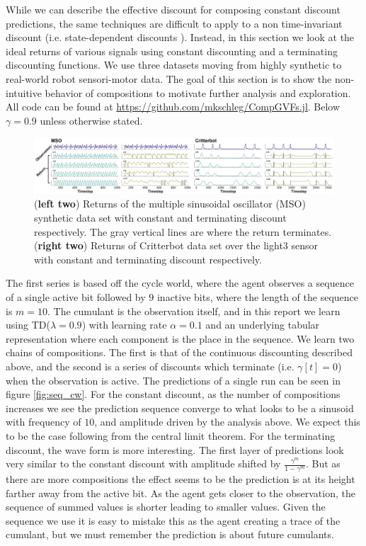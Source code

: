 \documentclass[11pt]{article} %
\begin{document}
While we can describe the effective discount for composing constant
discount predictions, the same techniques are difficult to apply to a
non time-invariant discount (i.e. state-dependent discounts
\parencite{white2015, sutton2011}).
Instead, in this section we look at the
ideal returns of various signals using constant discounting and a
terminating discounting functions. We use three
datasets moving from highly synthetic to real-world robot
sensori-motor data. The goal of this section is to show the
non-intuitive behavior of compositions to motivate further
analysis and exploration. All code can be found at \url{https://github.com/mkschleg/CompGVFs.jl}. Below $\gamma = 0.9$ unless otherwise stated.
%
%
\begin{figure}
  \centering
  \includegraphics[width=\textwidth]{plots/mso_cb.pdf}
  \caption{(\textbf{left two}) Returns of the multiple sinusoidal
    oscillator (MSO) synthetic data set with constant and terminating
    discount respectively. The gray vertical lines are where the
    return terminates. (\textbf{right two}) Returns of Critterbot
    data set over the light3 sensor with constant and terminating
    discount respectively. \vspace{-0.45cm}}
\end{figure}
%
%

The first series is based off the cycle world, where the agent
observes a sequence of a single active bit followed by $9$ inactive
bits, where the length of the sequence is $m=10$. The cumulant is the observation itself, and in this report we
learn using TD($\lambda=0.9$) with learning rate $\alpha=0.1$ and an underlying tabular representation
where each component is the place in the sequence. We learn two chains
of compositions. The first is that of the continuous discounting
described above, and the second is a series of discounts which
terminate (i.e. $\gamma[t]=0$) when the observation is active.
The predictions of a single run can be seen in figure
\ref{fig:seq_cw}. For the constant discount, as the number of
compositions increases we see the prediction sequence converge to what
looks to be a sinusoid with frequency of $10$, and amplitude driven by
the analysis above. We expect this to be the case following from the
central limit theorem. For the terminating discount, the wave form is
more interesting. The first layer of predictions look very similar to
the constant discount with amplitude shifted by $\frac{\gamma^{m}}{1
  - \gamma^{m}}$. But as there are more compositions the effect seems
to be the prediction is at its height farther away from the active
bit. As the agent gets closer to the observation, the sequence of
summed values is shorter leading to smaller values. Given the sequence
we use it is easy to mistake this as the agent creating a trace of the
cumulant, but we must remember the prediction is about future cumulants.
\end{document}
